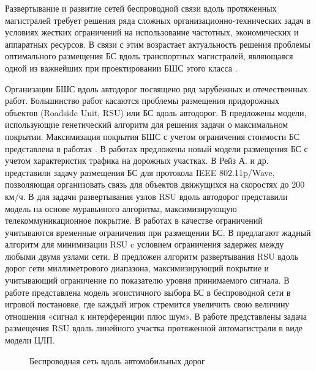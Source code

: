 Развертывание и развитие сетей беспроводной связи вдоль протяженных магистралей требует решения ряда сложных организационно-технических задач в условиях жестких ограничений на использование частотных, экономических и аппаратных ресурсов. В связи с этим возрастает актуальность решения проблемы оптимального размещения БС вдоль транспортных магистралей, являющаяся одной из важнейших при проектировании БШС этого класса \cite{Vish2015}. 

Организации БШС вдоль автодорог посвящено ряд зарубежных и отечественных работ. Большинство работ касаются проблемы размещения придорожных объектов (Roadside Unit, RSU) или БС вдоль автодорог. В \cite{Cavalcante2012, KHireddine2020} предложены модели, использующие генетический алгоритм для решения задачи о максимальном покрытии. Максимизация покрытия БШС с учетом ограничения стоимости БС представлена в работах \cite{BenBrahim2014, Vishnevsky2016_optimization}. В работах \cite{Liu2014, Gao2018, Jalooli2019} предложены новый модели размещения БС с учетом характеристик трафика на дорожных участках. В \cite{Reis2014} Рейз А. и др. представили задачу размещения БС для протокола IEEE 802.11p/Wave, позволяющая организовать связь для объектов движущихся на скоростях до 200 км/ч.   В \cite{Guerna2021} для задачи развертывания узлов RSU вдоль автодорог представили модель на основе муравьиного алгоритма, максимизирующую телекоммуникационное покрытие. В работах \cite{Cavalcante2012, Liu2017} в качестве ограничений учитываются временные ограничения при размещении БС. В \cite{Bao2018} предлагают жадный алгоритм для минимизации RSU c условием ограничения задержек между любыми двумя узлами сети. В \cite{Mavromatis2019} предложен алгоритм развертывания RSU вдоль дорог сети миллиметрового диапазона, максимизирующий покрытие и учитывающий ограничение по показателю уровня принимаемого сигнала. В работе \cite{Chirkova2020} представлена модель эгоистичного выбора БС  в беспроводной сети в игровой постановке, где каждый игрок стремится увеличить свою величину отношения «сигнал к интерференции плюс шум». В работе \cite{Ivanov2018} представлены задача размещения RSU вдоль линейного участка протяженной автомагистрали в виде модели ЦЛП.




\begin{figure}[ht]
  \caption{Беспроводная сеть вдоль автомобильных дорог}\label{fig:part2_roadisdeunit}
\end{figure}

